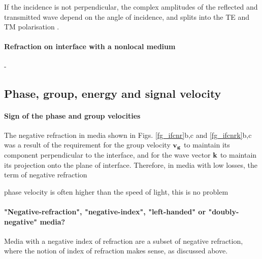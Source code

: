 If the incidence is not perpendicular, the complex amplitudes of the reflected and transmitted wave depend on the angle of incidence, and splits into the TE and TM polarisation \cite[p. 38]{born1999book}.  %

\paragraph{Refraction on interface with a nonlocal medium}   %
-





\subsection{Phase, group, energy and signal velocity}
\paragraph{Sign of the phase and group velocities}%
The negative refraction in media shown in Figs. \ref{fg_ifcnr}b,c and \ref{fg_ifcnrk}b,c was a result of the requirement for the group velocity ${\mathbf{v_g}}$ to maintain its component perpendicular to the interface, and for the wave vector ${\mathbf{k}}$ to maintain its projection onto the plane of interface. Therefore, in media with low losses, the term of negative refraction 


phase velocity is often higher than the speed of light, this is no problem\\

\paragraph{"Negative-refraction", "negative-index", "left-handed" or "doubly-negative" media?}  %
Media with a negative index of refraction are a subset of negative refraction, where the notion of index of refraction makes sense, as discussed above.

